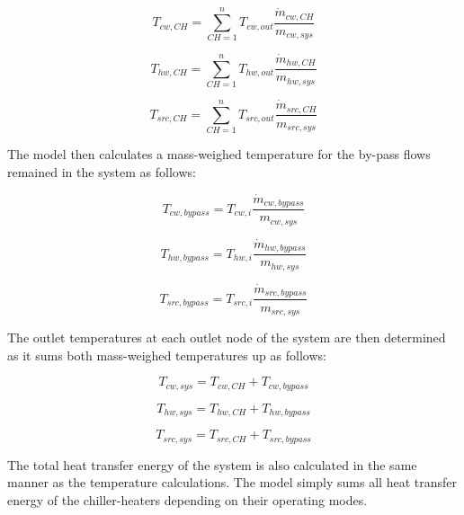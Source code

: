 \begin{equation}
{T_{cw,CH}} = \sum\limits_{CH = 1}^n {{T_{cw,out}}} \frac{{{{\dot m}_{cw,CH}}}}{{{m_{cw,sys}}}}
\end{equation}

\begin{equation}
{T_{hw,CH}} = \sum\limits_{CH = 1}^n {{T_{hw,out}}} \frac{{{{\dot m}_{hw,CH}}}}{{{m_{hw,sys}}}}
\end{equation}

\begin{equation}
{T_{src,CH}} = \sum\limits_{CH = 1}^n {{T_{src,out}}} \frac{{{{\dot m}_{src,CH}}}}{{{m_{src,sys}}}}
\end{equation}

The model then calculates a mass-weighed temperature for the by-pass flows remained in the system as follows:

\begin{equation}
{T_{cw,bypass}} = {T_{cw,i}}\frac{{{{\dot m}_{cw,bypass}}}}{{{m_{cw,sys}}}}
\end{equation}

\begin{equation}
{T_{hw,bypass}} = {T_{hw,i}}\frac{{{{\dot m}_{hw,bypass}}}}{{{m_{hw,sys}}}}
\end{equation}

\begin{equation}
{T_{src,bypass}} = {T_{src,i}}\frac{{{{\dot m}_{src,bypass}}}}{{{m_{src,sys}}}}
\end{equation}

The outlet temperatures at each outlet node of the system are then determined as it sums both mass-weighed temperatures up as follows:

\begin{equation}
{T_{cw,sys}} = {T_{cw,CH}} + {T_{cw,bypass}}
\end{equation}

\begin{equation}
{T_{hw,sys}} = {T_{hw,CH}} + {T_{hw,bypass}}
\end{equation}

\begin{equation}
{T_{src,sys}} = {T_{src,CH}} + {T_{src,bypass}}
\end{equation}

The total heat transfer energy of the system is also calculated in the same manner as the temperature calculations. The model simply sums all heat transfer energy of the chiller-heaters depending on their operating modes.
